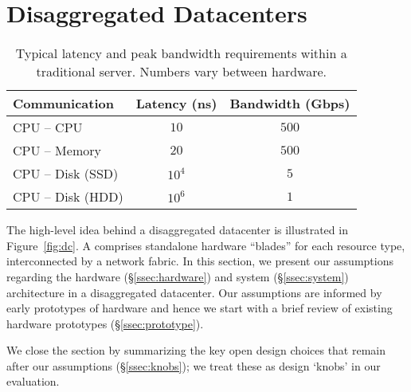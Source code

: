 \vspace{-0.1in}
\section{Disaggregated Datacenters}
\label{sec:summary}
\vspace{-0.05in}
\begin{table}
  \centering
  \small
  \begin{tabular}{l|c|c}
		\textbf{Communication} & \textbf{Latency (ns)} & \textbf{Bandwidth (Gbps)}\\\hline
	\hline
    CPU -- CPU & $10$ & $500$\\\hline
    CPU -- Memory & $20$ & $500$\\\hline
    CPU -- Disk (SSD) & $10^4$ & $5$\\\hline
    CPU -- Disk (HDD) & $10^6$ & $1$\\\hline
    \hline
  \end{tabular}
  \vspace{0.1in}
  \caption{\small{Typical latency and peak bandwidth requirements within a traditional server. Numbers vary between hardware.}}
  \label{tab:tech}
\end{table}

The high-level idea behind a disaggregated datacenter is illustrated in Figure~\ref{fig:dc}.
A \dis comprises standalone hardware ``blades'' for each resource type, %
interconnected by a network fabric.
In this section, we present our assumptions regarding the hardware (\S\ref{ssec:hardware}) and system (\S\ref{ssec:system}) architecture in a disaggregated datacenter. Our assumptions are informed by early prototypes of \dis hardware and hence we start with a brief review of existing \dis hardware prototypes (\S\ref{ssec:prototype}).

We close the section by summarizing the key open design choices that remain after our assumptions (\S\ref{ssec:knobs}); we treat these as design `knobs' in our evaluation.



